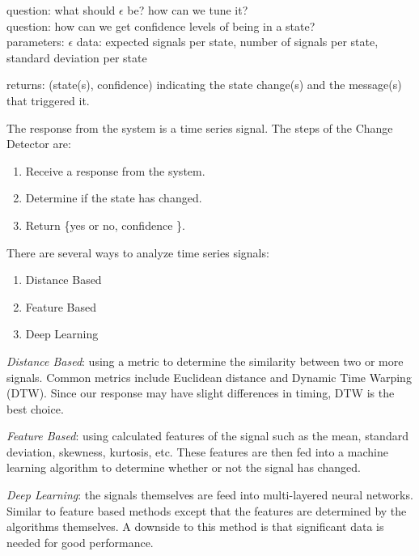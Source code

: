 \documentclass[11pt, a4paper]{article}
\begin{document}
question: what should $\epsilon$ be? how can we tune it?\\
question: how can we get confidence levels of being in a state?\\

parameters: $\epsilon$
data: expected signals per state, number of signals per state, standard deviation per state

returns: (state(s), confidence) indicating the state change(s) and the message(s) that triggered it.

The response from the system is a time series signal.
The steps of the Change Detector are:
\begin{enumerate}
    \item Receive a response from the system.
    \item Determine if the state has changed.
    \item Return \{yes or no, confidence \}. 
\end{enumerate}

There are several ways to analyze time series signals:
\begin{enumerate}
    \item Distance Based
    \item Feature Based
    \item Deep Learning
\end{enumerate}

\textit{Distance Based}: using a metric to determine the similarity between two or more signals.
Common metrics include Euclidean distance and Dynamic Time Warping (DTW).
Since our response may have slight differences in timing, DTW is the best choice.

\textit{Feature Based}: using calculated features of the signal such as the mean, standard deviation, skewness, kurtosis, etc.
These features are then fed into a machine learning algorithm to determine whether or not the signal has changed.

\textit{Deep Learning}: the signals themselves are feed into multi-layered neural networks.
Similar to feature based methods except that the features are determined by the algorithms themselves.
A downside to this method is that significant data is needed for good performance.


\end{document}
